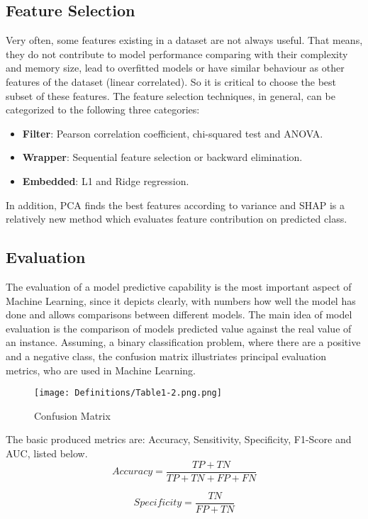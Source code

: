 \documentclass[journal,article,submit,pdftex,moreauthors]{Definitions/mdpi}
\begin{document}
\subsection{Feature Selection}
Very often, some features existing in a dataset are not always useful. That means, they do not contribute to model performance 
comparing with their complexity and memory size, lead to overfitted models or have similar behaviour as other features of the 
dataset (linear correlated). So it is critical to choose the best subset of these features. The feature selection techniques,
in general, can be categorized to the following three  categories:
\begin{itemize}
	\item \textbf{Filter}: Pearson correlation coefficient, chi-squared test and ANOVA.
	\item \textbf{Wrapper}: Sequential feature selection or backward elimination.
	\item \textbf{Embedded}: L1 and Ridge regression.
\end{itemize}
In addition, PCA finds the best features according to variance and SHAP is a relatively new method which evaluates feature 
contribution on predicted class.
\subsection{Evaluation}
The evaluation of a model predictive capability is the most important aspect of Machine Learning, since it depicts clearly, with 
numbers how well the model has done and allows comparisons between different models. The main idea of model evaluation is the
comparison of models predicted value against the real value of an instance. Assuming, a binary classification problem, where 
there are a positive and a negative class, the confusion matrix illustriates principal evaluation metrics, who are used in Machine
Learning.
\begin{figure}[H]
	\centering
	\texttt{[image: Definitions/Table1-2.png.png]}
	\caption{Confusion Matrix}
	\end{figure}   
The basic produced metrics are: Accuracy, Sensitivity, Specificity, F1-Score and AUC, listed below.
\begin{equation}
		Accuracy = \frac{TP+TN}{TP+TN+FP+FN}	
\end{equation}

\begin{equation}
	Specificity = \frac{TN}{FP+TN}
\end{equation}
\end{document}
